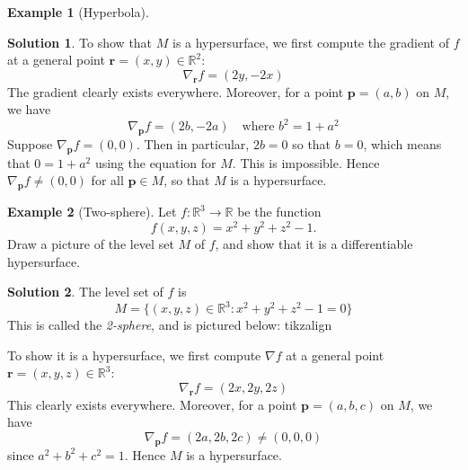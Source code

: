 \documentclass[a4paper,11pt]{book}
\theoremstyle{definition}
\newtheorem{example_environment}{Example}[chapter]
\newtheorem*{solution}{Solution}
\newcommand{\ve}[1]{\mathbf{#1}}
\newenvironment{example}
	{
		\begin{oframed} 
		\begin{example_environment}
	}
	{
		\end{example_environment}
		\end{oframed}
	}
\begin{document}
\begin{appendices}
\begin{example}[Hyperbola]
\begin{solution}
To show that $M$ is a hypersurface, we first compute the gradient of $f$ at a general point $\ve{r} = (x,y) \in \mathbb{R}^2$:
\[
 \nabla_\ve{r} f = (2y, -2x) 
\]
The gradient clearly exists everywhere. Moreover, for a point $\ve{p} = (a,b)$ on $M$, we have
\[
 \nabla_\ve{p} f = (2b, -2a) \quad \mbox{where } b^2 = 1 + a^2
\]
Suppose $\nabla_\ve{p} f = (0,0)$. Then in particular, $2b = 0$ so that $b=0$, which means that $0 = 1 + a^2$ using the equation for $M$. This is impossible. Hence $\nabla_\ve{p} f \neq (0,0)$ for all $\ve{p} \in M$, so that $M$ is a hypersurface.
\end{solution}

\end{example}

\begin{example}[Two-sphere] Let $f : \mathbb{R}^3 \rightarrow \mathbb{R}$ be the function
\[
 f(x,y,z) = x^2 + y^2 + z^2 -1.
\]
Draw a picture of the level set $M$ of $f$, and show that it is a differentiable hypersurface.
\begin{solution}
The level set of $f$ is 
\[
  M = \{ (x,y,z) \in \mathbb{R}^3 : x^2 + y^2 + z^2 - 1 = 0 \}
\]
This is called the {\em 2-sphere}, and is pictured below: tikzalign
\begin{center}
\end{center}

To show it is a hypersurface, we first compute $\nabla f$ at a general point $\ve{r} = (x,y,z) \in \mathbb{R}^3$:
\[
 \nabla_\ve{r} f = (2x, 2y, 2z)
\]
This clearly exists everywhere. Moreover, for a point $\ve{p} = (a, b, c)$ on $M$, we have
\[
 \nabla_\ve{p} f = (2a, 2b, 2c) \neq (0, 0, 0)
\]
since $a^2 + b^2 + c^2 = 1$. Hence $M$ is a hypersurface.
\end{solution}

\end{example}


\end{appendices}
\end{document}
